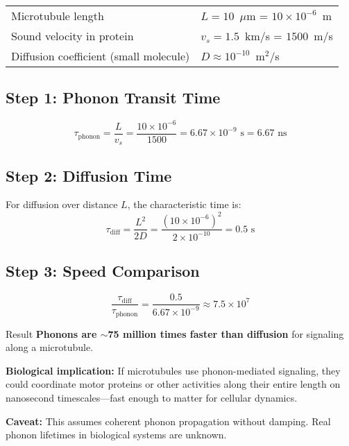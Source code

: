 \begin{tabular}{@{}ll@{}}
Microtubule length & $L = 10$~$\mu$m = $10 \times 10^{-6}$~m \\
Sound velocity in protein & $v_s = 1.5$~km/s = $1500$~m/s \\
Diffusion coefficient (small molecule) & $D \approx 10^{-10}$~m$^2$/s \\
\end{tabular}

\subsection*{Step 1: Phonon Transit Time}

\begin{equation}
\tau_{\text{phonon}} = \frac{L}{v_s} = \frac{10 \times 10^{-6}}{1500} = 6.67 \times 10^{-9} \text{ s} = 6.67 \text{ ns}
\label{eq:phonon-transit}
\end{equation}

\subsection*{Step 2: Diffusion Time}

For diffusion over distance $L$, the characteristic time is:
\begin{equation}
\tau_{\text{diff}} = \frac{L^2}{2D} = \frac{(10 \times 10^{-6})^2}{2 \times 10^{-10}} = 0.5 \text{ s}
\label{eq:diffusion-time}
\end{equation}

\subsection*{Step 3: Speed Comparison}

\begin{equation}
\frac{\tau_{\text{diff}}}{\tau_{\text{phonon}}} = \frac{0.5}{6.67 \times 10^{-9}} \approx 7.5 \times 10^{7}
\label{eq:speed-ratio}
\end{equation}

\begin{calloutbox}[colback=black!8!white,colframe=black]{Result}
\textbf{Phonons are $\sim$75 million times faster than diffusion} for signaling along a microtubule.

\textbf{Biological implication:} If microtubules use phonon-mediated signaling, they could coordinate motor proteins or other activities along their entire length on nanosecond timescales---fast enough to matter for cellular dynamics.

\textbf{Caveat:} This assumes coherent phonon propagation without damping. Real phonon lifetimes in biological systems are unknown.
\end{calloutbox}

